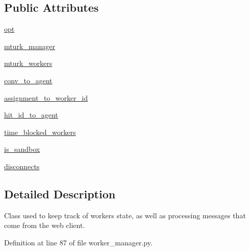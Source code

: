 \subsection*{Public Attributes}
\begin{DoxyCompactItemize}
\item 
\hyperlink{classparlai_1_1mturk_1_1core_1_1dev_1_1worker__manager_1_1WorkerManager_adb7992844dfa581014469721c7b6ebd8}{opt}
\item 
\hyperlink{classparlai_1_1mturk_1_1core_1_1dev_1_1worker__manager_1_1WorkerManager_ac998c8103c199cec59f152128f6b876c}{mturk\+\_\+manager}
\item 
\hyperlink{classparlai_1_1mturk_1_1core_1_1dev_1_1worker__manager_1_1WorkerManager_abb50897c2ac34971c1593cab077df63a}{mturk\+\_\+workers}
\item 
\hyperlink{classparlai_1_1mturk_1_1core_1_1dev_1_1worker__manager_1_1WorkerManager_a5ad208e55f54f2d2de934a17665b508d}{conv\+\_\+to\+\_\+agent}
\item 
\hyperlink{classparlai_1_1mturk_1_1core_1_1dev_1_1worker__manager_1_1WorkerManager_ad6da745885a93cca7e40eb3f21a42c36}{assignment\+\_\+to\+\_\+worker\+\_\+id}
\item 
\hyperlink{classparlai_1_1mturk_1_1core_1_1dev_1_1worker__manager_1_1WorkerManager_a90b094c83ec38bd8d95755cf99f2e771}{hit\+\_\+id\+\_\+to\+\_\+agent}
\item 
\hyperlink{classparlai_1_1mturk_1_1core_1_1dev_1_1worker__manager_1_1WorkerManager_a91e52a07f116d045069678e1b634ebeb}{time\+\_\+blocked\+\_\+workers}
\item 
\hyperlink{classparlai_1_1mturk_1_1core_1_1dev_1_1worker__manager_1_1WorkerManager_ae0e88a4e852d8e9577f9139aeaf9076b}{is\+\_\+sandbox}
\item 
\hyperlink{classparlai_1_1mturk_1_1core_1_1dev_1_1worker__manager_1_1WorkerManager_a7f6d658a79ddc418870fa31d23507070}{disconnects}
\end{DoxyCompactItemize}


\subsection{Detailed Description}
\begin{DoxyVerb}Class used to keep track of workers state, as well as processing
messages that come from the web client.
\end{DoxyVerb}
 

Definition at line 87 of file worker\+\_\+manager.\+py.




